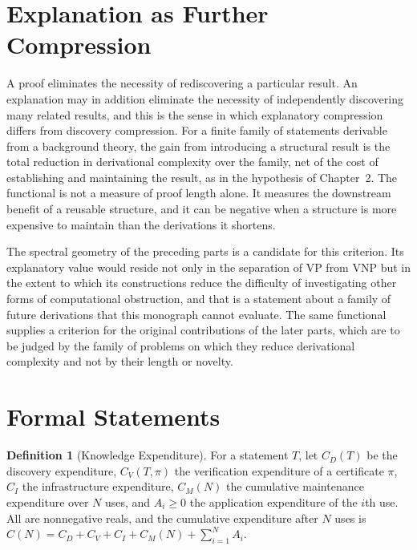 \documentclass[11pt,letterpaper]{report}
\theoremstyle{plain}
\theoremstyle{definition}
\newtheorem{definition}[theorem]{Definition}
\theoremstyle{remark}
\newcommand{\VP}{\mathrm{VP}}
\newcommand{\VNP}{\mathrm{VNP}}
\begin{document}
\section{Explanation as Further Compression}

A proof eliminates the necessity of rediscovering a particular result. An explanation may in addition eliminate the necessity of independently discovering many related results, and this is the sense in which explanatory compression differs from discovery compression. For a finite family of statements derivable from a background theory, the gain from introducing a structural result is the total reduction in derivational complexity over the family, net of the cost of establishing and maintaining the result, as in the hypothesis of Chapter~2. The functional is not a measure of proof length alone. It measures the downstream benefit of a reusable structure, and it can be negative when a structure is more expensive to maintain than the derivations it shortens.

The spectral geometry of the preceding parts is a candidate for this criterion. Its explanatory value would reside not only in the separation of $\VP$ from $\VNP$ but in the extent to which its constructions reduce the difficulty of investigating other forms of computational obstruction, and that is a statement about a family of future derivations that this monograph cannot evaluate. The same functional supplies a criterion for the original contributions of the later parts, which are to be judged by the family of problems on which they reduce derivational complexity and not by their length or novelty.

\section{Formal Statements}

\begin{definition}[Knowledge Expenditure]\label{def:expend}
For a statement $T$, let $C_D(T)$ be the discovery expenditure, $C_V(T,\pi)$ the verification expenditure of a certificate $\pi$, $C_I$ the infrastructure expenditure, $C_M(N)$ the cumulative maintenance expenditure over $N$ uses, and $A_i\ge0$ the application expenditure of the $i$th use. All are nonnegative reals, and the cumulative expenditure after $N$ uses is $C(N)=C_D+C_V+C_I+C_M(N)+\sum_{i=1}^NA_i$.
\end{definition}
\end{document}
